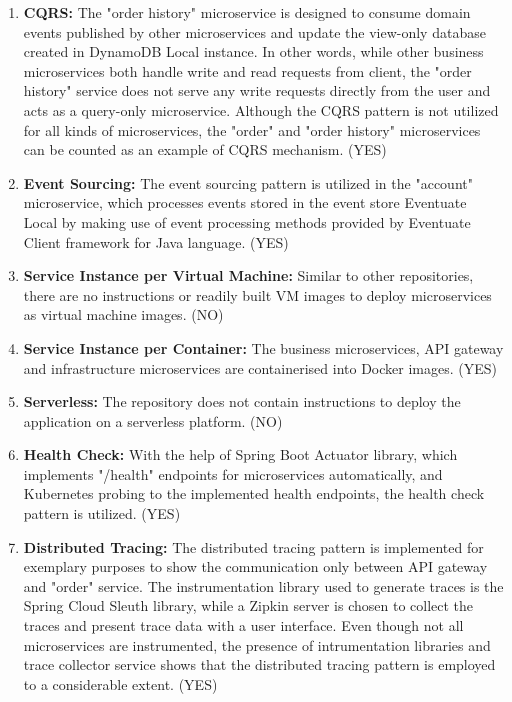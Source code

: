 \documentclass{Configuration_Files/PoliMi3i_thesis}
\begin{document}
\begin{enumerate}
    \item \textbf{CQRS:} The "order history" microservice is designed to consume domain events published by other microservices and update the view-only database created in DynamoDB Local instance.
    In other words, while other business microservices both handle write and read requests from client, the "order history" service does not serve any write requests directly from the user and acts as a query-only microservice.
    Although the CQRS pattern is not utilized for all kinds of microservices, the "order" and "order history" microservices can be counted as an example of CQRS mechanism. (YES)
    
    \item \textbf{Event Sourcing:} The event sourcing pattern is utilized in the "account" microservice, which processes events stored in the event store Eventuate Local by making use of event processing methods provided by Eventuate Client framework for Java language. (YES)
    
    \item \textbf{Service Instance per Virtual Machine:} Similar to other repositories, there are no instructions or readily built VM images to deploy microservices as virtual machine images. (NO)
    
    \item \textbf{Service Instance per Container:} The business microservices, API gateway and infrastructure microservices are containerised into Docker images. (YES)
    
    \item \textbf{Serverless:} The repository does not contain instructions to deploy the application on a serverless platform. (NO)
    
    \item \textbf{Health Check:} With the help of Spring Boot Actuator library, which implements "/health" endpoints for microservices automatically, and Kubernetes probing to the implemented health endpoints, the health check pattern is utilized. (YES)
    
    \item \textbf{Distributed Tracing:} The distributed tracing pattern is implemented for exemplary purposes to show the communication only between API gateway and "order" service.
    The instrumentation library used to generate traces is the Spring Cloud Sleuth library, while a Zipkin server is chosen to collect the traces and present trace data with a user interface.
    Even though not all microservices are instrumented, the presence of intrumentation libraries and trace collector service shows that the distributed tracing pattern is employed to a considerable extent. (YES)
    

\end{enumerate}
\end{document}
